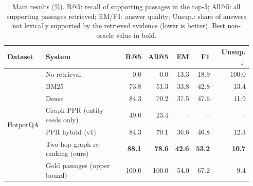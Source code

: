 \begin{table}[t]
\centering
\small
\caption{Main results (\%). R@5: recall of supporting passages in the top-5; All@5: all supporting passages retrieved; EM/F1: answer quality; Unsup.: share of answers not lexically supported by the retrieved evidence (lower is better). Best non-oracle value in bold.}
\label{tab:main}
\begin{tabular}{llrrrrr}
\toprule
Dataset & System & R@5 & All@5 & EM & F1 & Unsup.$\downarrow$ \\
\midrule
\multirow{7}{*}{HotpotQA} & No retrieval & 0.0 & 0.0 & 13.3 & 18.9 & 100.0 \\
 & BM25 & 73.8 & 51.3 & 33.8 & 42.8 & 13.4 \\
 & Dense & 84.3 & 70.2 & 37.5 & 47.6 & 11.9 \\
 & Graph-PPR (entity seeds only) & 49.0 & 23.4 & -- & -- & -- \\
 & PPR hybrid (v1) & 84.3 & 70.1 & 36.6 & 46.8 & 12.3 \\
 & Two-hop graph re-ranking (ours) & \textbf{88.1} & \textbf{78.6} & \textbf{42.6} & \textbf{53.2} & \textbf{10.7} \\
 & Gold passages (upper bound) & 100.0 & 100.0 & 54.0 & 67.2 & 9.4 \\
\bottomrule
\end{tabular}
\end{table}